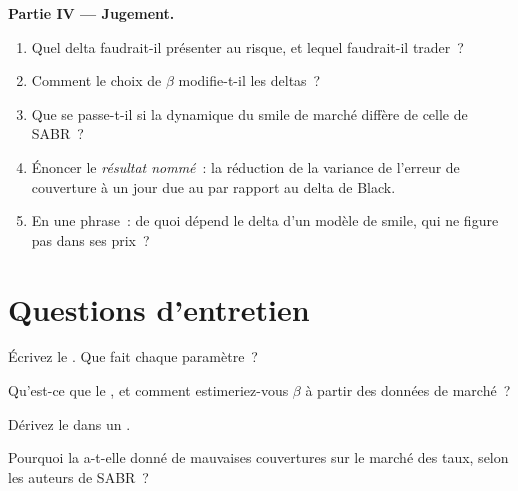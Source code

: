 \begin{problem}
\medskip\noindent\textbf{Partie IV --- Jugement.}
\begin{enumerate}[resume]
\item Quel delta faudrait-il présenter au risque, et lequel faudrait-il trader~?
\item Comment le choix de $\beta$ modifie-t-il les deltas~?
\item Que se passe-t-il si la dynamique du smile de marché diffère de celle de SABR~?
\item Énoncer le \emph{résultat nommé}~: la réduction de la variance de l'erreur de couverture à un jour
due au  par rapport au delta de Black.
\item En une phrase~: de quoi dépend le delta d'un modèle de smile, qui ne figure pas dans ses prix~?
\end{enumerate}
\end{problem}

\section{Questions d'entretien}

\begin{interviewq}\label{iq:dv:sabr-and-smile-dynamics:1}
Écrivez le . Que fait chaque paramètre~?
\end{interviewq}

\begin{interviewq}\label{iq:dv:sabr-and-smile-dynamics:2}
Qu'est-ce que le , et comment estimeriez-vous $\beta$ à partir des données de marché~?
\end{interviewq}

\begin{interviewq}\label{iq:dv:sabr-and-smile-dynamics:3}
Dérivez le  dans un .
\end{interviewq}

\begin{interviewq}\label{iq:dv:sabr-and-smile-dynamics:4}
Pourquoi la  a-t-elle donné de mauvaises couvertures sur le marché des taux, selon les auteurs de SABR~?
\end{interviewq}

